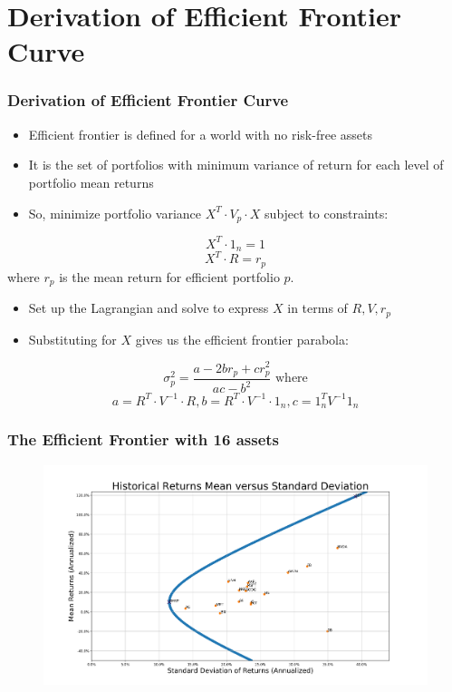 \documentclass{beamer}
\begin{document}
\section{Derivation of Efficient Frontier Curve}

\begin{frame}
\frametitle{Derivation of Efficient Frontier Curve}
\begin{itemize}
\item Efficient frontier is defined for a world with no risk-free assets
\item It is the set of portfolios with minimum variance of return for each level of portfolio mean returns
\item So, minimize portfolio variance $X^T \cdot V_p \cdot X$ subject to constraints:
\end{itemize}
$$X^T \cdot 1_n = 1$$
$$X^T \cdot R = r_p$$
where $r_p$ is the mean return for efficient portfolio $p$.
\begin{itemize}
\item Set up the Lagrangian and solve to express $X$ in terms of $R, V, r_p$ 
\item Substituting for $X$ gives us the efficient frontier parabola:
\end{itemize}
$$\sigma_p^2 = \frac {a - 2 b r_p + c r_p^2} {ac - b^2} \mbox{ where}$$
$$a = R^T \cdot V^{-1} \cdot R, b = R^T \cdot V^{-1} \cdot 1_n, c = 1_n^T V^{-1} 1_n$$
\end{frame}

\begin{frame}
\frametitle{The Efficient Frontier with 16 assets}
\begin{figure}
\includegraphics[scale=0.32]{EffFront.png}
\end{figure}
\end{frame}
\end{document}
